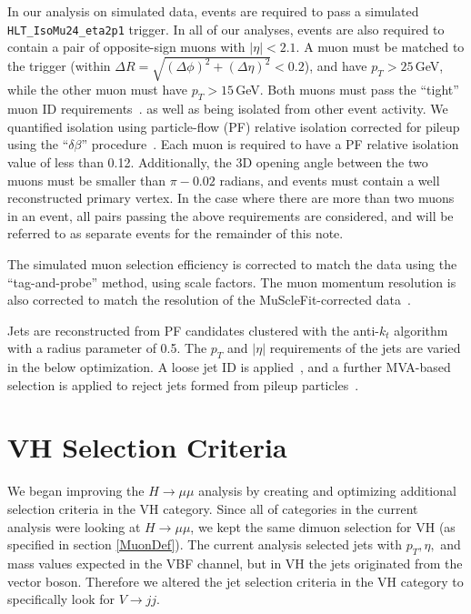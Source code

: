 \documentclass[12pt]{article}
\begin{document}
In our analysis on simulated data, events are required to pass a simulated \texttt{HLT\_IsoMu24\_eta2p1} trigger.
In all of our analyses, events are also required to contain a pair of opposite-sign muons with $|\eta|<2.1$.
A muon must be matched to the trigger (within $\Delta R = \sqrt{(\Delta \phi)^2+(\Delta \eta)^2}< 0.2$), 
and have $p_T>25$\,GeV, while the other muon must have $p_T>15$\,GeV.
Both muons must pass the ``tight'' muon ID requirements~\cite{AN2012_459}.
as well as being isolated from other event activity.  We quantified isolation using
particle-flow (PF) relative isolation corrected for pileup using the ``$\delta \beta$''
procedure~\cite{AN2012_459}.  Each muon is required to have a PF relative isolation value
of less than 0.12.  Additionally, the 3D opening angle between the two muons must be
smaller than $\pi-0.02$ radians, and events must contain a well reconstructed primary
vertex.
In the case where there are more than two muons in an event, all pairs passing the above
requirements are considered, and will be referred to as separate events for the remainder
of this note.  

The simulated muon selection efficiency is corrected to match the data using 
the ``tag-and-probe'' method, using scale factors.  The muon momentum resolution
is also corrected to match the resolution of the MuScleFit-corrected data~\cite{AN2012_459}.

Jets are reconstructed from PF candidates clustered with the anti-$k_t$ algorithm with
a radius parameter of 0.5.  The $p_T$ and $|\eta|$ requirements of the jets are varied in
the below optimization.  A loose jet ID is applied~\cite{AN2012_459}, and a further
MVA-based selection is applied to reject jets formed from pileup particles~\cite{PUID}.

\section{VH Selection Criteria}

We began improving the $H \rightarrow \mu \mu$ analysis by creating and optimizing additional selection criteria in the VH category. 
Since all of categories in the current analysis were looking at $H \rightarrow \mu \mu$, we kept the same dimuon 
selection for VH (as specified in section \ref{MuonDef}). 
The current analysis selected jets with $p_{T}, \eta,$ and mass values expected in the VBF channel, but in VH the jets originated from the vector boson. 
Therefore we altered the jet selection criteria in the VH category to specifically look for $V \rightarrow jj$.
\end{document}
